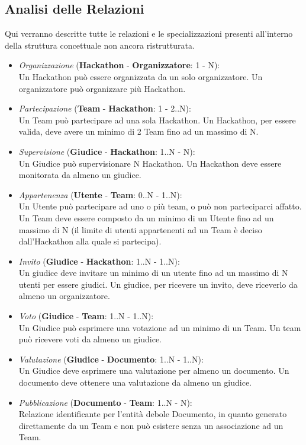 \documentclass[a4paper, 10pt]{article}
\begin{document}
	\subsection{Analisi delle Relazioni}
	Qui verranno descritte tutte le relazioni e le specializzazioni presenti all'interno della struttura concettuale non ancora ristrutturata.
	\begin{itemize}
		\item \textit{Organizzazione} (\textbf{Hackathon} - \textbf{Organizzatore}: 1 - N):\\Un Hackathon può essere organizzata da un solo organizzatore. Un organizzatore può organizzare più Hackathon.
		\item \textit{Partecipazione} (\textbf{Team} - \textbf{Hackathon}: 1 - 2..N):\\Un Team può partecipare ad una sola Hackathon. Un Hackathon, per essere valida, deve avere un minimo di 2 Team fino ad un massimo di N.
		\item \textit{Supervisione} (\textbf{Giudice} - \textbf{Hackathon}: 1..N - N):\\Un Giudice può supervisionare N Hackathon. Un Hackathon deve essere monitorata da almeno un giudice.
		\item \textit{Appartenenza} (\textbf{Utente} - \textbf{Team}: 0..N - 1..N):\\Un Utente può partecipare ad uno o più team, o può non parteciparci affatto. Un Team deve essere composto da un minimo di un Utente fino ad un massimo di N (il limite di utenti appartenenti ad un Team è deciso dall'Hackathon alla quale si partecipa).
		\item \textit{Invito} (\textbf{Giudice} - \textbf{Hackathon}: 1..N - 1..N):\\Un giudice deve invitare un minimo di un utente fino ad un massimo di N utenti per essere giudici. Un giudice, per ricevere un invito, deve riceverlo da almeno un organizzatore.
		\item \textit{Voto} (\textbf{Giudice} - \textbf{Team}: 1..N - 1..N):\\Un Giudice può esprimere una votazione ad un minimo di un Team. Un team può ricevere voti da almeno un giudice.
		\item \textit{Valutazione} (\textbf{Giudice} - \textbf{Documento}: 1..N - 1..N):\\Un Giudice deve esprimere una valutazione per almeno un documento. Un documento deve ottenere una valutazione da almeno un giudice.
		\item \textit{Pubblicazione} (\textbf{Documento} - \textbf{Team}: 1..N - N):\\Relazione identificante per l'entità debole Documento, in quanto generato direttamente da un Team e non può esistere senza un associazione ad un Team.
	\end{itemize}
	\newpage
\end{document}
